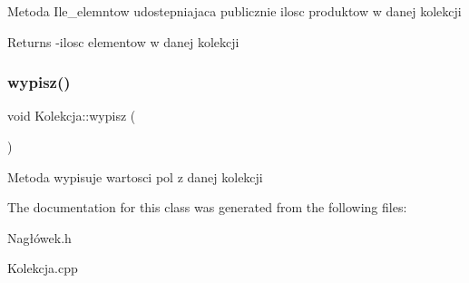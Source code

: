 Metoda Ile\+\_\+elemntow udostepniajaca publicznie ilosc produktow w danej kolekcji \begin{DoxyReturn}{Returns}
-\/ilosc elementow w danej kolekcji 
\end{DoxyReturn}
\mbox{\label{class_kolekcja_a61fa134a0db31a2141311dc2904d3dad}} 
\subsubsection{\texorpdfstring{wypisz()}{wypisz()}}
{\footnotesize\ttfamily void Kolekcja\+::wypisz (\begin{DoxyParamCaption}{ }\end{DoxyParamCaption})}

Metoda wypisuje wartosci pol z danej kolekcji 

The documentation for this class was generated from the following files\+:\begin{DoxyCompactItemize}
\item 
Nagłówek.\+h\item 
Kolekcja.\+cpp\end{DoxyCompactItemize}
